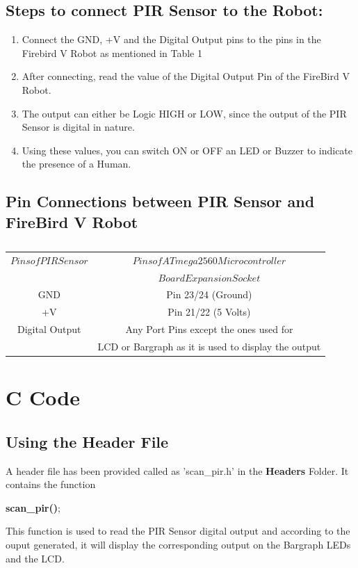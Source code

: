 \documentclass[a4paper,12 pt]{article}
\begin{document}
\subsection{Steps to connect PIR Sensor to the Robot:}
\begin{enumerate}
\item 	Connect the GND, +V and the Digital Output pins to the pins in the Firebird V Robot as mentioned in Table 1
\item 	After connecting, read the value of the Digital Output Pin of the FireBird V Robot.
\item 	The output can either be Logic HIGH or LOW, since the output of the PIR Sensor is digital in nature.
\item 	Using these values, you can switch ON or OFF an LED or Buzzer to indicate the presence of a Human. 
\end{enumerate}

\subsection{Pin Connections between PIR Sensor and FireBird V Robot}

\begin{table}[ht]
\hspace{-10mm}
\caption{}
\begin{tabular}{|c|c|}

\hline

$Pins of PIR Sensor$&$Pins of ATmega2560  Microcontroller $\\
$ $&$Board Expansion Socket$\\
\hline
GND&Pin 23/24 (Ground)\\
\hline
+V&Pin 21/22 (5 Volts)\\
\hline
Digital Output&Any Port Pins except the ones used for\\
 &LCD or Bargraph as it is used to display the output\\
\hline
\end{tabular}
\label{table:t1}
\end{table}

\section{C Code}
\subsection{Using the Header File}
A header file has been provided called as 'scan\_pir.h' in the \textbf{Headers} Folder.
It contains the function
\begin{center}
 \textbf{scan\_pir()};
\end{center}
This function is used to read the PIR Sensor digital output and according to the ouput generated, it will display the corresponding output on the Bargraph LEDs and the LCD.\\
\end{document}
